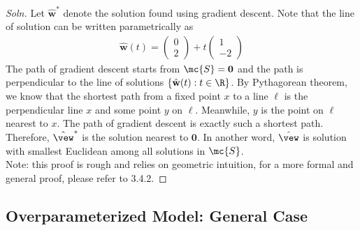 \documentclass{article}
\begin{document}
	\subsubsection{}
	\begin{proof}[Soln]
		Let $\hat{\textbf{w}}^*$ denote the solution found using gradient descent. Note that the line of solution can be written parametrically as
		\begin{align}
			\hat{\textbf{w}}(t) = \begin{pmatrix}
				0 \\ 2
			\end{pmatrix} + t \begin{pmatrix}
				1 \\ -2
			\end{pmatrix}
		\end{align}
		The path of gradient descent starts from $\mc{S} = \textbf{0}$ and the path is perpendicular to the line of solutions $\{\hat{\textbf{w}}(t): t \in \R\}$. By  Pythagorean theorem, we know that the shortest path from a fixed point $x$ to a line $\ell$ is the perpendicular line $x$ and some point $y$ on $\ell$. Meanwhile, $y$ is the point on $\ell$ nearest to $x$. The path of gradient descent is exactly such a shortest path. Therefore, $\hat{\vew}^*$ is the solution nearest to $\textbf{0}$. In another word, $\hat{\vew}$ is solution with smallest Euclidean among all solutions in $\mc{S}$. \\
		Note: this proof is rough and relies on geometric intuition, for a more formal and general proof, please refer to 3.4.2.
	\end{proof}
	
	\subsection{Overparameterized Model: General Case}
\end{document}
